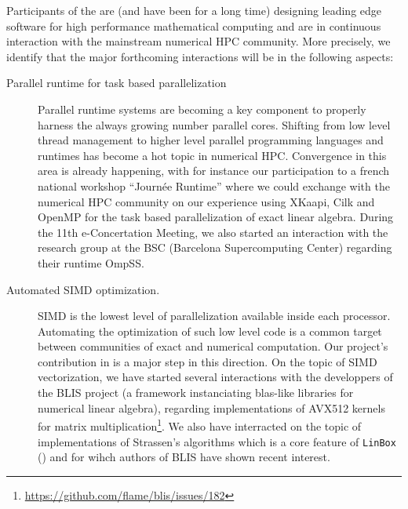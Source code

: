 Participants of the  are (and have been for a long time) designing
leading edge software for high performance mathematical computing and are in
continuous interaction with the mainstream numerical HPC community.
More precisely, we identify that the major forthcoming interactions will be in
the following aspects:
\begin{description}
\item[Parallel runtime for task based parallelization] Parallel runtime systems
  are becoming a key component to properly harness the always growing number
  parallel cores. Shifting from low level thread management to higher level
  parallel programming languages and runtimes has become a hot topic in numerical
  HPC. Convergence in this area is already happening, with for instance our
  participation to a french national workshop ``Journée Runtime'' where we could exchange with the
  numerical HPC community on our experience using XKaapi, Cilk and OpenMP for the task
  based parallelization of exact linear algebra. During the 11th e-Concertation
  Meeting, we also started an interaction with the research group at the BSC
  (Barcelona Supercomputing Center) regarding their runtime OmpSS.
\item[Automated SIMD optimization.] SIMD is the lowest level of parallelization
  available inside each processor. Automating the optimization of such low level code is a common target
  between communities of exact and numerical computation. 
  Our project's contribution in   is a major
  step in this direction.
  On the topic of SIMD vectorization, we have started several interactions with the developpers of the BLIS project
  (a framework instanciating blas-like libraries for numerical linear algebra),
  regarding implementations of AVX512 kernels for matrix multiplication\footnote{\url{https://github.com/flame/blis/issues/182}}. We also
  have interracted on the topic of implementations of Strassen's algorithms
  which is a core feature of \texttt{LinBox} () and for wihch authors of BLIS have shown recent interest.
  
\end{description}






